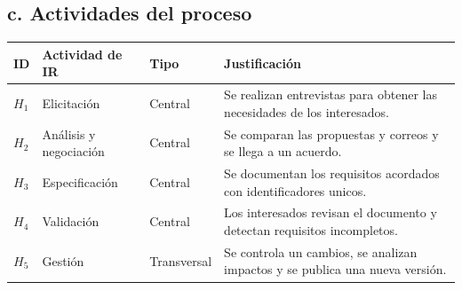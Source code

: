 \documentclass{article}
\begin{document}
\subsection*{c. Actividades del proceso}
\begin{center}
\begin{tabular}{|p{1cm}|p{3.5cm}|p{2cm}|p{6cm}|}
\hline
\textbf{ID} & \textbf{Actividad de IR} & \textbf{Tipo} & \textbf{Justificación} \\ \hline
$H_1$ & Elicitación & Central & Se realizan entrevistas para obtener las necesidades de los interesados. \\ \hline
$H_2$ & Análisis y negociación & Central & Se comparan las propuestas y correos y se llega a un acuerdo. \\ \hline
$H_3$ & Especificación & Central & Se documentan los requisitos acordados con identificadores unicos. \\ \hline
$H_4$ & Validación & Central & Los interesados revisan el documento y detectan requisitos incompletos. \\ \hline
$H_5$ & Gestión & Transversal & Se controla un cambios, se analizan impactos y se publica una nueva versión. \\ \hline
\end{tabular}
\end{center}
\end{document}

